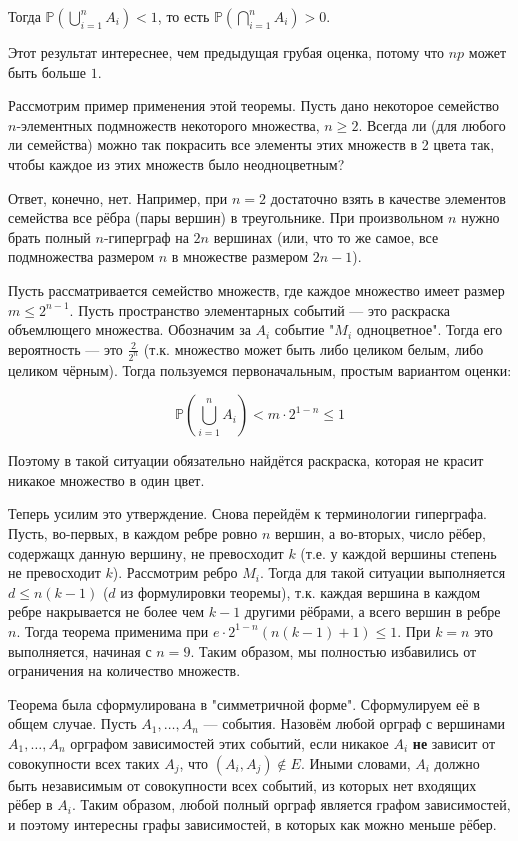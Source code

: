 \documentclass[12pt]{article}
\renewcommand{\P}{\mathbb{P}}
\begin{document}
Тогда $\P \left(\bigcup_{i=1}^n A_i \right) < 1$, то есть $\P \left(\bigcap_{i=1}^n A_i \right) > 0$.

Этот результат интереснее, чем предыдущая грубая оценка, потому что $np$ может быть больше $1$.

Рассмотрим пример применения этой теоремы. Пусть дано некоторое семейство $n$-элементных подмножеств некоторого множества, $n \geq 2$. Всегда ли (для любого ли семейства) можно так покрасить все элементы этих множеств в 2 цвета так, чтобы каждое из этих множеств было неодноцветным?

Ответ, конечно, нет. Например, при $n = 2$ достаточно взять в качестве элементов семейства все рёбра (пары вершин) в треугольнике. При произвольном $n$ нужно брать полный $n$-гиперграф на $2n$ вершинах (или, что то же самое, все подмножества размером $n$ в множестве размером $2n-1$).

Пусть рассматривается семейство множеств, где каждое множество имеет размер $m \leq 2^{n-1}$. Пусть пространство элементарных событий — это раскраска объемлющего множества. Обозначим за $A_i$ событие "$M_i$ одноцветное". Тогда его вероятность — это $\frac 2 {2^n}$ (т.к. множество может быть либо целиком белым, либо целиком чёрным). Тогда пользуемся первоначальным, простым вариантом оценки:

\[
\P \left( \bigcup_{i=1}^n A_i \right) < m \cdot 2^{1-n} \leq 1
\]

Поэтому в такой ситуации обязательно найдётся раскраска, которая не красит никакое множество в один цвет.

Теперь усилим это утверждение. Снова перейдём к терминологии гиперграфа. Пусть, во-первых, в каждом ребре ровно $n$ вершин, а во-вторых, число рёбер, содержащх данную вершину, не превосходит $k$ (т.е. у каждой вершины степень не превосходит $k$). Рассмотрим ребро $M_i$. Тогда для такой ситуации выполняется $d \leq n(k-1)$ ($d$ из формулировки теоремы), т.к. каждая вершина в каждом ребре накрывается не более чем $k-1$ другими рёбрами, а всего вершин в ребре $n$. Тогда теорема применима при $e \cdot 2^{1-n}(n(k-1)+1) \leq 1$. При $k=n$ это выполняется, начиная с $n = 9$. Таким образом, мы полностью избавились от ограничения на количество множеств.

Теорема была сформулирована в "симметричной форме". Сформулируем её в общем случае. Пусть $A_1, \ldots, A_n$ — события. Назовём любой орграф с вершинами $A_1, \ldots, A_n$ орграфом зависимостей этих событий, если никакое $A_i$ \textbf{не} зависит от совокупности всех таких $A_j$, что $(A_i, A_j) \not\in E$. Иными словами, $A_i$ должно быть независимым от совокупности всех событий, из которых нет входящих рёбер в $A_i$. Таким образом, любой полный орграф является графом зависимостей, и поэтому интересны графы зависимостей, в которых как можно меньше рёбер.
\end{document}
